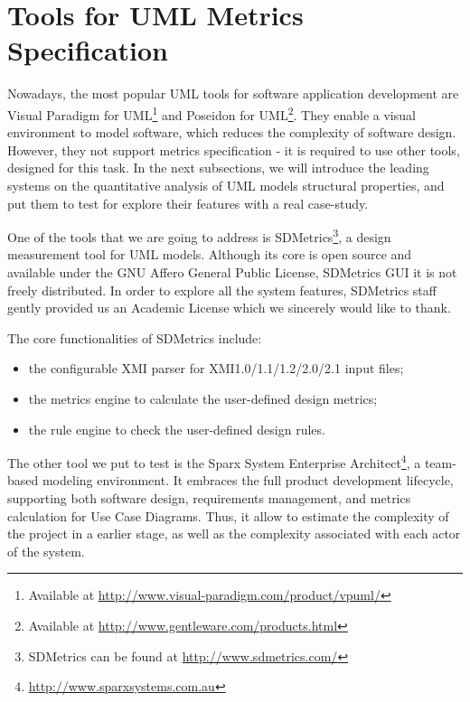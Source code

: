 \section{Tools for UML Metrics Specification} \label{tools}

Nowadays, the most popular UML tools for software application development are \textsf{Visual Paradigm for UML\footnote{Available at \url{http://www.visual-paradigm.com/product/vpuml/}}} and \textsf{Poseidon for UML}\footnote{Available at \url{http://www.gentleware.com/products.html}}.
They enable a visual environment to model software, which reduces the complexity of software design.
However, they not support metrics specification - it is required to use other tools, designed for this task.
In the next subsections, we will introduce the leading systems on the quantitative analysis of UML models structural properties, and put them to test for explore their features with a real case-study.

One of the tools that we are going to address is SDMetrics\footnote{SDMetrics can be found at \url{http://www.sdmetrics.com/}}, a design measurement tool for UML models.
Although its core is open source and available under the GNU Affero General Public License, SDMetrics GUI it is not freely distributed. 
In order to explore all the system features, SDMetrics staff gently provided us an Academic License which we sincerely would like to thank.

The core functionalities of SDMetrics include:
\begin{itemize}
\item the configurable XMI parser for XMI1.0/1.1/1.2/2.0/2.1 input files;
\item the metrics engine to calculate the user-defined design metrics;
\item the rule engine to check the user-defined design rules.
\end{itemize}


The other tool we put to test is the \textsf{Sparx System Enterprise Architect}{\footnote{\url{http://www.sparxsystems.com.au}}}, a team-based modeling environment. 
It embraces the full product development lifecycle, supporting both software design, requirements management, and metrics calculation for Use Case Diagrams.
Thus, it allow to estimate the complexity of the project in a earlier stage, as well as the complexity associated with each actor of the system.

